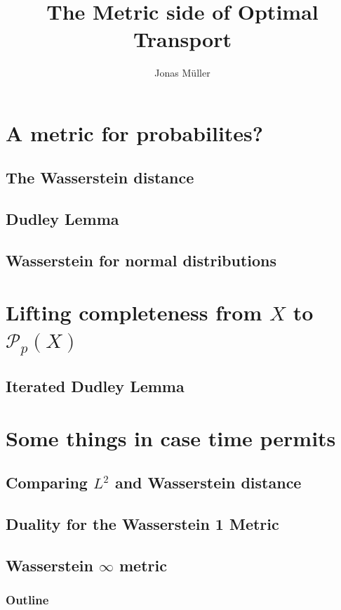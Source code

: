\documentclass[10pt]{beamer}
\author[Jonas Müller]{Jonas Müller}
\theoremstyle{reminder}
\begin{document}
\title[Wasserstein Metric]{The Metric side of Optimal Transport}
\institute{}
\date{}

\begin{frame}
    \titlepage
\end{frame}

\section{A metric for probabilites?}
\subsection{The Wasserstein distance}
\subsection{Dudley Lemma}
\subsection{Wasserstein for normal distributions}

\section{Lifting completeness from $X$ to $\mathcal{P}_p(X)$}
\subsection{Iterated Dudley Lemma}
\section{Some things in case time permits}
\subsection{Comparing $L^2$ and Wasserstein distance}
\subsection{Duality for the Wasserstein 1 Metric}
\subsection{Wasserstein $\infty$ metric}

\begin{frame}
    \frametitle{Outline}
    \tableofcontents
\end{frame}
\end{document}
